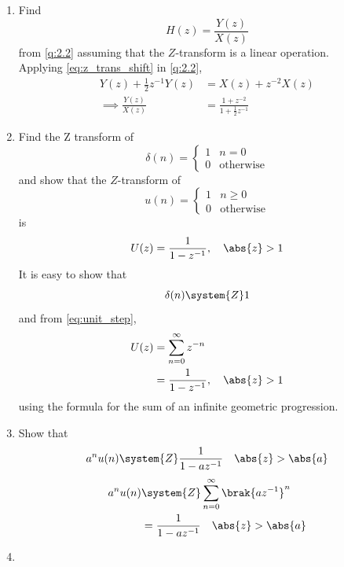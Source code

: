 \documentclass[journal,12pt,twocolumn]{IEEEtran}
\theoremstyle{remark}
\begin{document}
\begin{enumerate}[label=\thesection.\arabic*]
\item Find
%
\begin{equation}
H(z) = \frac{Y(z)}{X(z)}
\end{equation}
from  \eqref{q:2.2} assuming that the $Z$-transform is a linear operation.
\\
\solution  Applying \eqref{eq:z_trans_shift} in \eqref{q:2.2},
\begin{align}
Y(z) + \frac{1}{2}z^{-1}Y(z) &= X(z)+z^{-2}X(z)
\\
\implies \frac{Y(z)}{X(z)} &= \frac{1 + z^{-2}}{1 + \frac{1}{2}z^{-1}}
\label{eq:freq_resp}
\end{align}
%
\item Find the Z transform of 
\begin{equation}
\delta(n)
=
\begin{cases}
1 & n = 0
\\
0 & \text{otherwise}
\end{cases}
\end{equation}
and show that the $Z$-transform of
\begin{equation}
\label{eq:unit_step}
u(n)
=
\begin{cases}
1 & n \ge 0
\\
0 & \text{otherwise}
\end{cases}
\end{equation}
is
\begin{equation}
U(z) = \frac{1}{1-z^{-1}}, \quad \abs{z} > 1
\end{equation}
\solution It is easy to show that
\begin{equation}
\delta(n) \system{Z} 1
\end{equation}
and from \eqref{eq:unit_step},
\begin{align}
U(z) &= \sum _{n= 0}^{\infty}z^{-n}
\\
&=\frac{1}{1-z^{-1}}, \quad \abs{z} > 1
\end{align}
using the formula for the sum of an infinite geometric progression.
%
\item Show that 
\begin{equation}
\label{eq:anun}
a^nu(n) \system{Z} \frac{1}{1-az^{-1}} \quad \abs{z} > \abs{a}
\end{equation}
\solution 
\begin{align}
	a^nu(n) &\system{Z} \sum_{n = 0}^{\infty}\brak{az^{-1}}^n \\
			&= \frac{1}{1-az^{-1}} \quad \abs{z} > \abs{a}
\end{align}
%
\item 

\end{enumerate}
\end{document}

